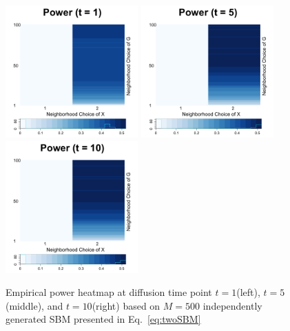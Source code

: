 \documentclass[12pt]{article}
\theoremstyle{definition}
\begin{document}
\begin{figure}[H]
	\centering
	\includegraphics[width=2in]{../Figure/twoSBM_power1.png}
	\includegraphics[width=2in]{../Figure/twoSBM_power5.png}
	\includegraphics[width=2in]{../Figure/twoSBM_power10.png}
	\caption{Empirical power heatmap at diffusion time point $t=1$(left), $t=5$(middle), and $t=10$(right) based on $M = 500$ independently generated SBM presented in Eq.~\ref{eq:twoSBM}}
	\label{fig:twoSBM_power}
\end{figure}
\end{document}
